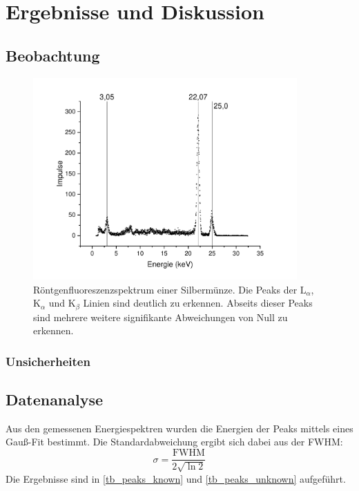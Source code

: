 \documentclass[
	a4paper,
	12pt,
	pagesize,
	ngerman
]{scrartcl}
\begin{document}
	\section{Ergebnisse und Diskussion}
	

	\subsection{Beobachtung}
	
	\begin{figure}[H]
		\includegraphics[width=0.9\textwidth]{images/Silbermuenze}
		\centering
		\caption{Röntgenfluoreszenzspektrum einer Silbermünze. Die Peaks der $\text{L}_\alpha$, $\text{K}_\alpha$ und $\text{K}_\beta$ Linien sind deutlich zu erkennen. Abseits dieser Peaks sind mehrere weitere signifikante Abweichungen von Null zu erkennen.} %
		\label{fig_ag_plot}
		\centering
	\end{figure}
	
	\subsubsection{Unsicherheiten} %
	\subsection{Datenanalyse}
	Aus den gemessenen Energiespektren wurden die Energien der Peaks mittels eines Gauß-Fit bestimmt.
	Die Standardabweichung ergibt sich dabei aus der FWHM:
	\begin{equation}
		\sigma = \frac{\text{FWHM}}{2\sqrt{\ln 2}}
	\end{equation}
	Die Ergebnisse sind in \cref{tb_peaks_known} und \cref{tb_peaks_unknown} aufgeführt.
	
\end{document}
